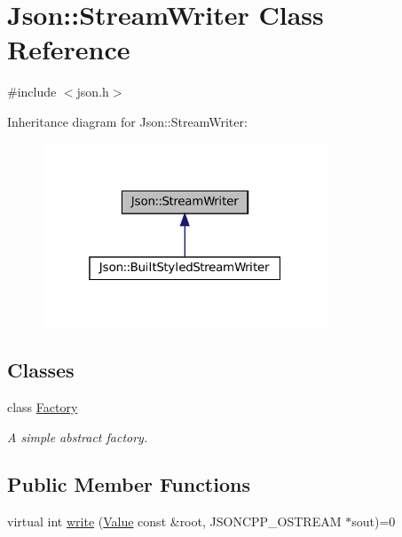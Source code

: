 \hypertarget{classJson_1_1StreamWriter}{}\section{Json\+:\+:Stream\+Writer Class Reference}
\label{classJson_1_1StreamWriter}


{\ttfamily \#include $<$json.\+h$>$}



Inheritance diagram for Json\+:\+:Stream\+Writer\+:
\nopagebreak
\begin{figure}[H]
\begin{center}
\leavevmode
\includegraphics[width=241pt]{classJson_1_1StreamWriter__inherit__graph}
\end{center}
\end{figure}
\subsection*{Classes}
\begin{DoxyCompactItemize}
\item 
class \hyperlink{classJson_1_1StreamWriter_1_1Factory}{Factory}
\begin{DoxyCompactList}\small\item\em A simple abstract factory. \end{DoxyCompactList}\end{DoxyCompactItemize}
\subsection*{Public Member Functions}
\begin{DoxyCompactItemize}
\item 
virtual int \hyperlink{classJson_1_1StreamWriter_a84278bad0c9a9fc587bc2a97c5bb5993}{write} (\hyperlink{classJson_1_1Value}{Value} const \&root, J\+S\+O\+N\+C\+P\+P\+\_\+\+O\+S\+T\+R\+E\+AM $\ast$sout)=0
\end{DoxyCompactItemize}
